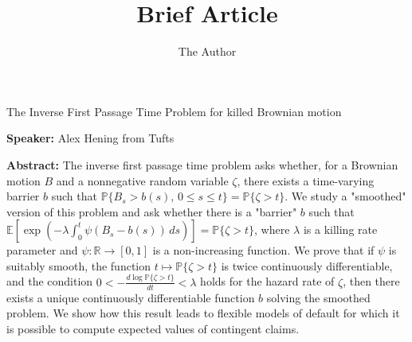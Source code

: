 \documentclass[11pt]{amsart}
\title{Brief Article}
\author{The Author}
\begin{document}

The Inverse First Passage Time Problem for killed Brownian motion
\vspace{.2in}

\noindent
{\bf Speaker:} Alex Hening from Tufts
\vspace{.2in}



\noindent
{\bf Abstract:}
The inverse first passage time problem asks whether, for a Brownian motion $B$ and a nonnegative random variable $\zeta$, there exists a time-varying barrier $b$ such that $\mathbb{P}\{B_s > b(s), \, 0 \le s \le t\} = \mathbb{P}\{\zeta > t\}$. We study a "smoothed" version of this problem and ask whether there is a "barrier" $b$ such that $\mathbb{E}[\exp(-\lambda \int_0^t \psi(B_s - b(s)) \, ds)] = \mathbb{P}\{\zeta > t\}$, where $\lambda$ is a killing rate parameter and $\psi: \mathbb{R} \to [0,1]$ is a non-increasing function. We prove that if $\psi$ is suitably smooth, the function $t \mapsto \mathbb{P}\{\zeta > t\}$ is twice continuously differentiable, and the condition $0 < -\frac{d \log \mathbb{P}\{\zeta > t\}}{dt} < \lambda$ holds for the hazard rate of $\zeta$, then there exists a unique continuously differentiable function $b$ solving the smoothed problem. We show how this result leads to flexible models of default for which it is possible to compute expected values of contingent claims.
\end{document}
